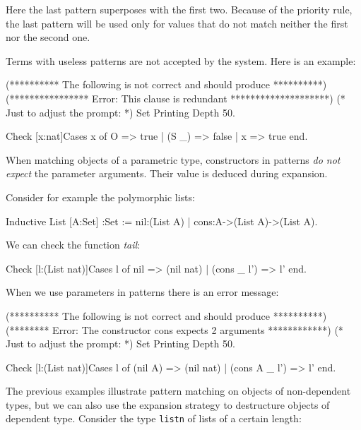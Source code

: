 Here the last pattern superposes with the first two. Because
of the priority rule, the last pattern 
will be used only for values that do not match neither the  first nor
the second one.  

Terms with useless patterns are not accepted by the
system. Here is an example:
\begin{coq_eval}
(********** The following is not correct and should produce **********)
(**************** Error: This clause is redundant ********************)
(* Just to adjust the prompt: *) Set Printing Depth 50.
\end{coq_eval}
\begin{coq_example}
Check [x:nat]Cases x of O => true | (S _) => false | x => true end.
\end{coq_example}

When matching objects of a parametric type, constructors in patterns
{\em do not expect} the parameter arguments. Their value is deduced
during expansion.

Consider for example the polymorphic lists:

\begin{coq_example}
Inductive List [A:Set] :Set := 
  nil:(List A) 
| cons:A->(List A)->(List A).
\end{coq_example}

We can check the function {\em tail}:

\begin{coq_example}
Check [l:(List nat)]Cases l of 
                             nil        => (nil nat)
                          | (cons _ l') => l'
                           end.
\end{coq_example}


When we use parameters in patterns there is an error message:
\begin{coq_eval}
(********** The following is not correct and should produce **********)
(******** Error: The constructor cons expects 2 arguments ************)
(* Just to adjust the prompt: *) Set Printing Depth 50.
\end{coq_eval}
\begin{coq_example}
Check [l:(List nat)]Cases l of 
                             (nil A)      => (nil nat)
                          | (cons A _ l') => l'
                           end.
\end{coq_example}



The previous examples illustrate pattern matching on objects of
non-dependent types, but we can also 
use the expansion strategy to destructure objects of dependent type.
Consider the type \texttt{listn} of lists of a certain length:


